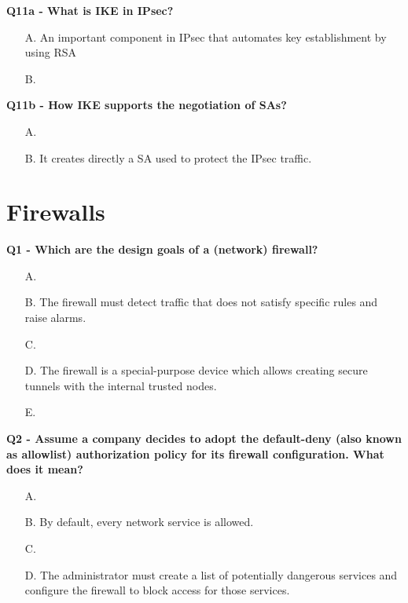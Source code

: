 \textbf{Q11a - What is IKE in IPsec?}
\begin{itemize}
    \item[A.] An important component in IPsec that automates key establishment by using RSA
    \item[B.] 
\end{itemize}
\textbf{Q11b - How IKE supports the negotiation of SAs?}
\begin{itemize}
    \item[A.] 
    \item[B.] It creates directly a SA used to protect the IPsec traffic.
\end{itemize}

\section{Firewalls}

\textbf{Q1 - Which are the design goals of a (network) firewall?}
\begin{itemize}
    \item[A.] 
    \item[B.] The firewall must detect traffic that does not satisfy specific rules and raise alarms.
    \item[C.] 
    \item[D.] The firewall is a special-purpose device which allows creating secure tunnels with the internal trusted nodes.
    \item[E.] 
\end{itemize}

\textbf{Q2 - Assume a company decides to adopt the default-deny (also known as allowlist) authorization policy for its firewall configuration. What does it mean?}
\begin{itemize}
    \item[A.] 
    \item[B.] By default, every network service is allowed.
    \item[C.] 
    \item[D.] The administrator must create a list of potentially dangerous services and configure the firewall to block access for those services.
\end{itemize}

